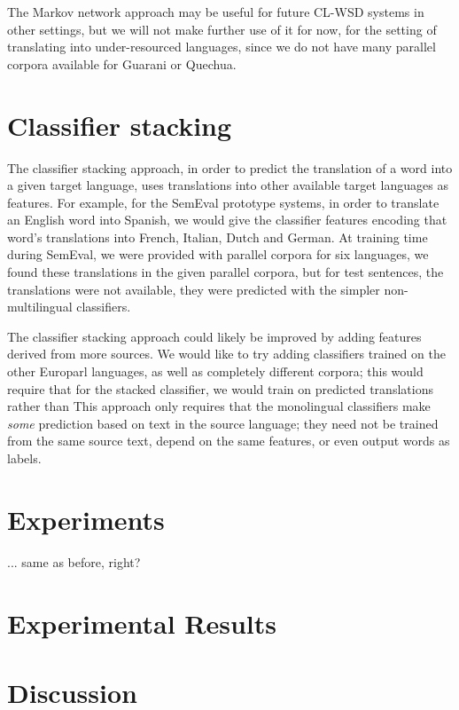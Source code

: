 The Markov network approach may be useful for future CL-WSD systems in other
settings, but we will not make further use of it for now, for the setting of
translating into under-resourced languages, since we do not have many parallel
corpora available for Guarani or Quechua.

\section{Classifier stacking}
The classifier stacking approach, in order to predict the translation of a word
into a given target language, uses translations into other available target
languages as features.
For example, for the SemEval prototype systems, in order to translate an
English word into Spanish, we would give the classifier features encoding that
word's translations into French, Italian, Dutch and German.
At training time during SemEval, we were provided with parallel corpora for six
languages, we found these translations in the given parallel corpora, but
for test sentences, the translations were not available, they were predicted
with the simpler non-multilingual classifiers.

The classifier stacking approach could likely be improved by adding features
derived from more sources.
We would like to try adding classifiers trained on the other Europarl
languages, as well as completely different corpora; this would require that for
the stacked classifier, we would train on predicted translations rather than
This approach only requires that the monolingual classifiers make \emph{some}
prediction based on text in the source language;
they need not be trained from the same source text, depend on the same
features, or even output words as labels.

\section{Experiments}
\label{sec:multilingual-experiments}
... same as before, right?

\section{Experimental Results}
\label{sec:multilingual-results}

\section{Discussion}

